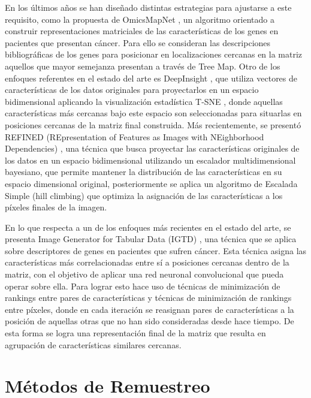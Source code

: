 \documentclass{uathesis-es}
\begin{document}
{	En los últimos años se han diseñado distintas estrategias para ajustarse a este requisito, como la propuesta de OmicsMapNet \cite{ma2019omicsmapnet}, un algoritmo orientado a construir representaciones matriciales de las características de los genes en pacientes que presentan cáncer. Para ello se consideran las descripciones bibliográficas de los genes para posicionar en localizaciones cercanas en la matriz aquellos que mayor semejanza presentan a través de Tree Map. Otro de los enfoques referentes en el estado del arte es DeepInsight \cite{Sharma2019}, que utiliza vectores de características de los datos originales para proyectarlos en un espacio bidimensional aplicando la visualización estadística T-SNE \cite{van2008visualizing}, donde aquellas características más cercanas bajo este espacio son seleccionadas para situarlas en posiciones cercanas de la matriz final construida. Más recientemente, se presentó REFINED (REpresentation of Features as Images with NEighborhood Dependencies) \cite{Bazgir2020}, una técnica que busca proyectar las características originales de los datos en un espacio bidimensional utilizando un escalador multidimensional bayesiano, que permite mantener la distribución de las características en su espacio dimensional original, posteriormente se aplica un algoritmo de Escalada Simple (hill climbing) que optimiza la asignación de las características a los píxeles finales de la imagen.
	
	En lo que respecta a un de los enfoques más recientes en el estado del arte, se presenta Image Generator for Tabular Data (IGTD) \cite{Zhu2021}, una técnica que se aplica sobre descriptores de genes en pacientes que sufren cáncer. Esta técnica asigna las características más correlacionadas entre sí a posiciones cercanas dentro de la matriz, con el objetivo de aplicar una red neuronal convolucional que pueda operar sobre ella. Para lograr esto hace uso de técnicas de minimización de rankings entre pares de características y técnicas de minimización de rankings entre píxeles, donde en cada iteración se reasignan pares de características a la posición de aquellas otras que no han sido consideradas desde hace tiempo. De esta forma se logra una representación final de la matriz que resulta en agrupación de características similares cercanas.
	
	
	\section{Métodos de Remuestreo}
	\label{SOAT_RESAMPLING}
	
}
\end{document}
